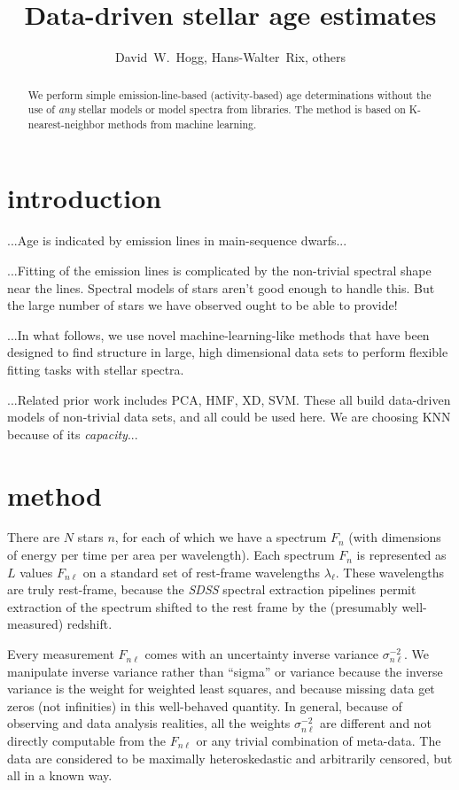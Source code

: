 \documentclass[12pt, preprint]{aastex}
\newcommand{\project}[1]{\textsl{#1}}
\newcommand{\invvar}{\sigma^{-2}}
\begin{document}
\title{Data-driven stellar age estimates}
\author{
  David~W.~Hogg,
  Hans-Walter~Rix, others
}

\begin{abstract}
We perform simple emission-line-based (activity-based) age
determinations without the use of \emph{any} stellar models or model
spectra from libraries.  The method is based on K-nearest-neighbor
methods from machine learning.
\end{abstract}

\section{introduction}

...Age is indicated by emission lines in main-sequence dwarfs...

...Fitting of the emission lines is complicated by the non-trivial
spectral shape near the lines.  Spectral models of stars aren't good
enough to handle this.  But the large number of stars we have observed
ought to be able to provide!

...In what follows, we use novel machine-learning-like methods that
have been designed to find structure in large, high dimensional data
sets to perform flexible fitting tasks with stellar spectra.

...Related prior work includes PCA, HMF, XD, SVM.  These all build
data-driven models of non-trivial data sets, and all could be used
here.  We are choosing KNN because of its \emph{capacity}...

\section{method}

There are $N$ stars $n$, for each of which we have a spectrum $F_n$
(with dimensions of energy per time per area per wavelength).  Each
spectrum $F_n$ is represented as $L$ values $F_{n\ell}$ on a standard set
of rest-frame wavelengths $\lambda_\ell$.  These wavelengths are truly
rest-frame, because the \project{SDSS} spectral extraction pipelines
permit extraction of the spectrum shifted to the rest frame by the
(presumably well-measured) redshift.

Every measurement $F_{n\ell}$ comes with an uncertainty inverse
variance $\invvar_{n\ell}$.  We manipulate inverse variance rather
than ``sigma'' or variance because the inverse variance is the weight
for weighted least squares, and because missing data get zeros (not
infinities) in this well-behaved quantity.  In general, because of
observing and data analysis realities, all the weights
$\invvar_{n\ell}$ are different and not directly computable from the
$F_{n\ell}$ or any trivial combination of meta-data.  The data are
considered to be maximally heteroskedastic and arbitrarily censored,
but all in a known way.
\end{document}
